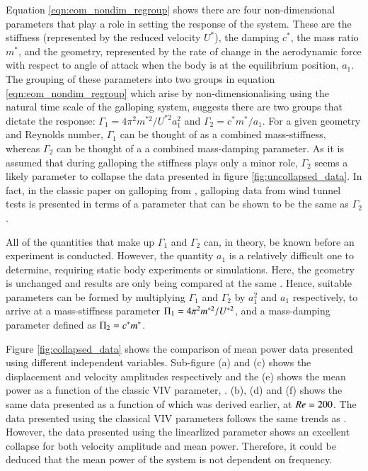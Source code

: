  Equation \ref{eqn:eom_nondim_regroup} shows there are four non-dimensional parameters that play a role in setting the response of the system. These are the stiffness (represented by the reduced velocity $U^*$), the damping $c^*$, the mass ratio $m^*$, and the geometry, represented by the rate of change in the aerodynamic force with respect to angle of attack when the body is at the equilibrium position, $a_1$. The grouping of these parameters into two groups in equation \ref{eqn:eom_nondim_regroup} which arise by non-dimensionalising using the natural time scale of the galloping system, suggests there are two groups that dictate the response: $\Gamma_1 = 4\pi^2m^{*2}/U^{*2}a_1^2$ and $\Gamma_2 = c^*m^*/a_1$. For a given geometry and Reynolds number, $\Gamma_1$ can be thought of as a combined mass-stiffness, whereas $\Gamma_2$ can be thought of a a combined mass-damping parameter. As it is assumed that during galloping the stiffness plays only a minor role, $\Gamma_2$ seems a likely parameter to collapse the data presented in figure \ref{fig:uncollapsed_data}. In fact, in the classic paper on galloping from \citet{Parkinson1964}, galloping data from wind tunnel tests is presented in terms of a parameter that can be shown to be the same as $\Gamma_2$.
 
 All of the quantities that make up $\Gamma_1$ and $\Gamma_2$ can, in theory, be known before an experiment is conducted. However, the quantity $a_1$ is a relatively difficult one to determine, requiring static body experiments or simulations. Here, the geometry is unchanged and results are only being compared at the same \reynoldsnumber. Hence, suitable parameters can be formed by multiplying $\Gamma_1$ and $\Gamma_2$ by $a_1^2$ and $a_1$ respectively, to arrive at a mass-stiffness parameter $\Pi_1 =  4\pi^2m^{*2}/U^{*2}$, and a mass-damping parameter defined as $\Pi_2 = c^*m^*$.
 
 
%   
  
   Figure \ref{fig:collapsed_data} shows the comparison of mean power data presented using different independent variables. Sub-figure (a) and (c) shows the displacement and velocity amplitudes respectively and the (e) shows the mean power as a function of the classic VIV parameter, \ustar. (b), (d) and (f) shows the same data presented as a function of \massdamp which was derived earlier, at $Re=200$. The data presented using the classical VIV parameters follows the same trends as \cite{Barrero-Gil2010a}. However, the data presented using the linearlized parameter shows an excellent collapse for both velocity amplitude and mean power. Therefore, it could be deduced that the mean power  of the system is not dependent on frequency.
   

